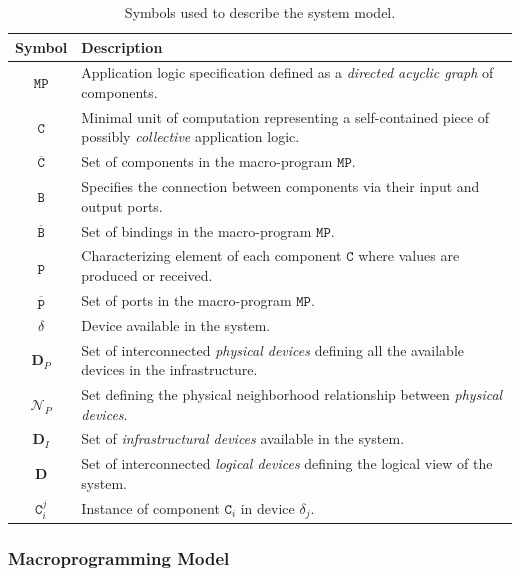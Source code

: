 \begin{table}
  \def\arraystretch{1.2}
  \begin{tabularx}{\linewidth}{c X}
    \toprule
    \textbf{Symbol} & \textbf{Description} \\
    \hline
    \hline
    $\mathtt{MP}$           & Application logic specification defined as a \emph{directed acyclic graph} of components. \\
    $\mathtt{C}$            & Minimal unit of computation representing a self-contained piece of possibly \emph{collective} application logic. \\
    $\overline{\mathtt{C}}$ & Set of components in the macro-program $\mathtt{MP}$. \\
    $\mathtt{B}$            & Specifies the connection between components via their input and output ports. \\
    $\overline{\mathtt{B}}$ & Set of bindings in the macro-program $\mathtt{MP}$. \\
    $\mathtt{p}$            & Characterizing element of each component $\mathtt{C}$ where values are produced or received. \\
    $\overline{\mathtt{p}}$ & Set of ports in the macro-program $\mathtt{MP}$. \\
    $\delta$                & Device available in the system. \\
    $\mathbf{D}_P$          & Set of interconnected \emph{physical devices} defining all the available devices in the infrastructure. \\
    $\mathcal{N}_P$         & Set defining the physical neighborhood relationship between \emph{physical devices}. \\
    $\mathbf{D}_I$          & Set of \emph{infrastructural devices} available in the system. \\
    $\mathbf{D}$            & Set of interconnected \emph{logical devices} defining the logical view of the system. \\
    $\mathtt{C}_i^j$        & Instance of component $\mathtt{C}_i$ in device $\delta_j$. \\
    \bottomrule
  \end{tabularx}
  \caption{Symbols used to describe the system model.}
  \label{tab:symbols}
\end{table}

\subsubsection{Macroprogramming Model}

